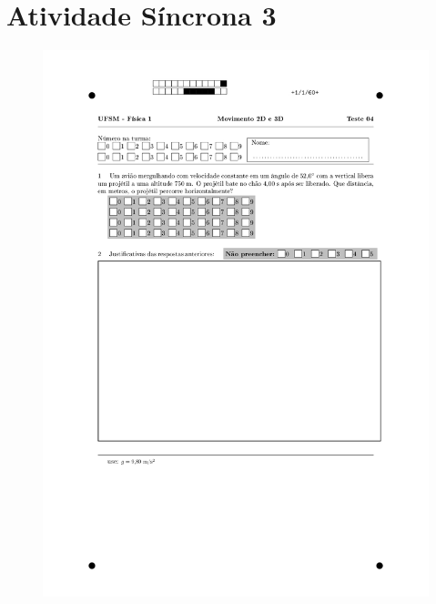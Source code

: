 \section{Atividade Síncrona 3} \label{ch:orp1e3}
\vspace*{\fill}
\begin{figure}[H]\centering
\includegraphics[scale=0.7]{fig/orp1q3r_page-0001.jpg}
\end{figure}
\vspace*{\fill}
